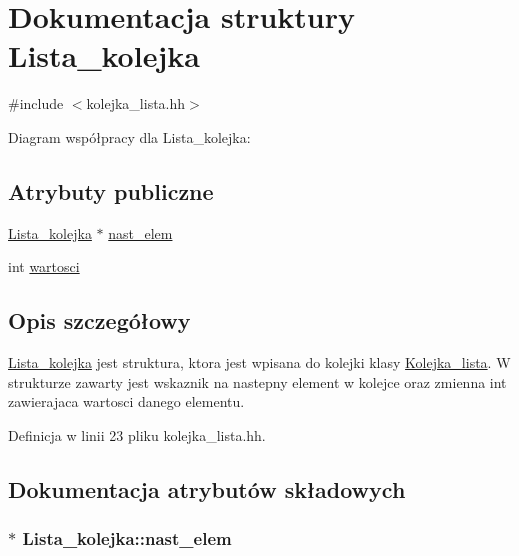 \hypertarget{struct_lista__kolejka}{\section{\-Dokumentacja struktury \-Lista\-\_\-kolejka}
\label{struct_lista__kolejka}
}


{\ttfamily \#include $<$kolejka\-\_\-lista.\-hh$>$}



\-Diagram współpracy dla \-Lista\-\_\-kolejka\-:
\subsection*{\-Atrybuty publiczne}
\begin{DoxyCompactItemize}
\item 
\hyperlink{struct_lista__kolejka}{\-Lista\-\_\-kolejka} $\ast$ \hyperlink{struct_lista__kolejka_a84e11e9a5a31cb0037e4928e8cd4eb20}{nast\-\_\-elem}
\item 
int \hyperlink{struct_lista__kolejka_ac8991eb71fc123a0a1318e1e6214aec7}{wartosci}
\end{DoxyCompactItemize}


\subsection{\-Opis szczegółowy}
\hyperlink{struct_lista__kolejka}{\-Lista\-\_\-kolejka} jest struktura, ktora jest wpisana do kolejki klasy \hyperlink{class_kolejka__lista}{\-Kolejka\-\_\-lista}. \-W strukturze zawarty jest wskaznik na nastepny element w kolejce oraz zmienna int zawierajaca wartosci danego elementu. 

\-Definicja w linii 23 pliku kolejka\-\_\-lista.\-hh.



\subsection{\-Dokumentacja atrybutów składowych}
\hypertarget{struct_lista__kolejka_a84e11e9a5a31cb0037e4928e8cd4eb20}{
\subsubsection[{nast\-\_\-elem}]{$\ast$ {\bf \-Lista\-\_\-kolejka\-::nast\-\_\-elem}}}\label{struct_lista__kolejka_a84e11e9a5a31cb0037e4928e8cd4eb20}


